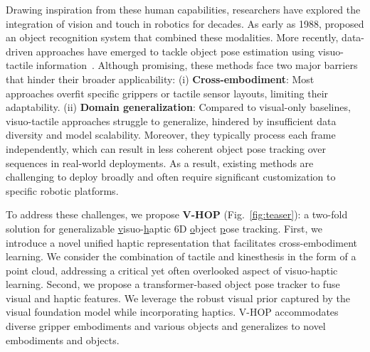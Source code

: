 \documentclass[11pt, a4paper, logo, twocolumn]{brown}
\newcommand{\shortname}{V-HOP\xspace}
\begin{document}
Drawing inspiration from these human capabilities, researchers have explored the integration of vision and touch in robotics for decades.
As early as 1988, \citet{allen_integrating_1988} proposed an object recognition system that combined these modalities.
More recently, data-driven approaches have emerged to tackle object pose estimation using visuo-tactile information~\cite{li_vihope_2023, suresh_neuralfeels_2024, dikhale_visuotactile_2022, wan_vint-6d_2024, rezazadeh_hierarchical_2023, tu_posefusion_2023, gao_-hand_2023, li_hypertaxel_2024}.
Although promising, these methods face two major barriers that hinder their broader applicability:
(i) \textbf{Cross-embodiment}: Most approaches overfit specific grippers or tactile sensor layouts, limiting their adaptability.
(ii) \textbf{Domain generalization}: Compared to visual-only baselines, visuo-tactile approaches struggle to generalize, hindered by insufficient data diversity and model scalability.
Moreover, they typically process each frame independently, which can result in less coherent object pose tracking over sequences in real-world deployments.
As a result, existing methods are challenging to deploy broadly and often require significant customization to specific robotic platforms.

To address these challenges, we propose \textbf{\shortname} (Fig.~\ref{fig:teaser}): a two-fold solution for generalizable \underline{v}isuo-\underline{h}aptic 6D \underline{o}bject \underline{p}ose tracking.
First, we introduce a novel unified haptic representation that facilitates cross-embodiment learning.
We consider the combination of tactile and kinesthesis in the form of a point cloud, addressing a critical yet often overlooked aspect of visuo-haptic learning. 
Second, we propose a transformer-based object pose tracker to fuse visual and haptic features.
We leverage the robust visual prior captured by the visual foundation model while incorporating haptics.
\shortname accommodates diverse gripper embodiments and various objects and generalizes to novel embodiments and objects.
\end{document}
